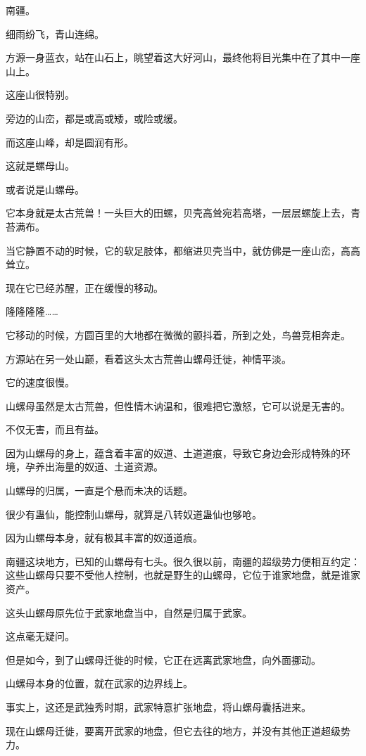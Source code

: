 
\begin{this_body}

南疆。

细雨纷飞，青山连绵。

方源一身蓝衣，站在山石上，眺望着这大好河山，最终他将目光集中在了其中一座山上。

这座山很特别。

旁边的山峦，都是或高或矮，或险或缓。

而这座山峰，却是圆润有形。

这就是螺母山。

或者说是山螺母。

它本身就是太古荒兽！一头巨大的田螺，贝壳高耸宛若高塔，一层层螺旋上去，青苔满布。

当它静置不动的时候，它的软足肢体，都缩进贝壳当中，就仿佛是一座山峦，高高耸立。

现在它已经苏醒，正在缓慢的移动。

隆隆隆隆……

它移动的时候，方圆百里的大地都在微微的颤抖着，所到之处，鸟兽竞相奔走。

方源站在另一处山巅，看着这头太古荒兽山螺母迁徙，神情平淡。

它的速度很慢。

山螺母虽然是太古荒兽，但性情木讷温和，很难把它激怒，它可以说是无害的。

不仅无害，而且有益。

因为山螺母的身上，蕴含着丰富的奴道、土道道痕，导致它身边会形成特殊的环境，孕养出海量的奴道、土道资源。

山螺母的归属，一直是个悬而未决的话题。

很少有蛊仙，能控制山螺母，就算是八转奴道蛊仙也够呛。

因为山螺母本身，就有极其丰富的奴道道痕。

南疆这块地方，已知的山螺母有七头。很久很以前，南疆的超级势力便相互约定：这些山螺母只要不受他人控制，也就是野生的山螺母，它位于谁家地盘，就是谁家资产。

这头山螺母原先位于武家地盘当中，自然是归属于武家。

这点毫无疑问。

但是如今，到了山螺母迁徙的时候，它正在远离武家地盘，向外面挪动。

山螺母本身的位置，就在武家的边界线上。

事实上，这还是武独秀时期，武家特意扩张地盘，将山螺母囊括进来。

现在山螺母迁徙，要离开武家的地盘，但它去往的地方，并没有其他正道超级势力。


\end{this_body}
